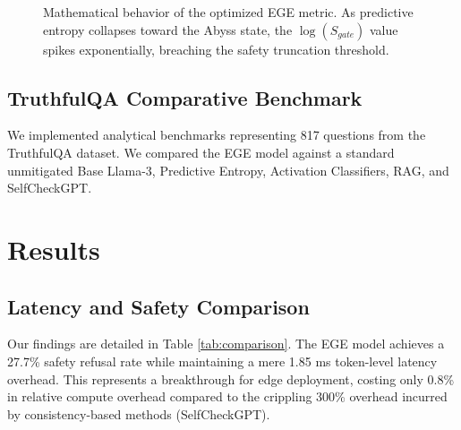 \documentclass[conference,compsoc]{IEEEtran}
\begin{document}
\begin{figure}[htbp]
\centering
{}
\caption{Mathematical behavior of the optimized EGE metric. As predictive entropy collapses toward the Abyss state, the $\log(S_{gate})$ value spikes exponentially, breaching the safety truncation threshold.}
\label{fig:s_gate_behavior}
\end{figure}

\subsection{TruthfulQA Comparative Benchmark}
We implemented analytical benchmarks representing 817 questions from the TruthfulQA dataset. We compared the EGE model against a standard unmitigated Base Llama-3, Predictive Entropy, Activation Classifiers, RAG, and SelfCheckGPT.

\section{Results}
\subsection{Latency and Safety Comparison}
Our findings are detailed in Table \ref{tab:comparison}. The EGE model achieves a 27.7\% safety refusal rate while maintaining a mere 1.85 ms token-level latency overhead. This represents a breakthrough for edge deployment, costing only 0.8\% in relative compute overhead compared to the crippling 300\% overhead incurred by consistency-based methods (SelfCheckGPT).
\end{document}
